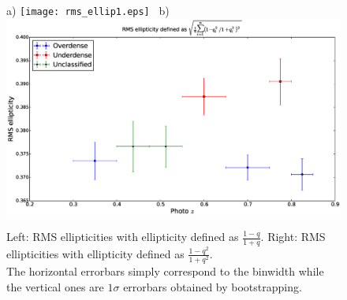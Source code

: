 \documentclass[twocolumn,useAMS,usenatbib]{mn2e}
\begin{document}
\begin{figure}
 \centering
 a) \texttt{[image: rms\_ellip1.eps]} \
 b) \includegraphics[width=0.9\columnwidth]{rms_ellip2_noevolution.eps} \\
 \caption{Left: RMS ellipticities with ellipticity defined as $\frac{1-q}{1+q}$. \; 
          Right: RMS ellipticities with ellipticity defined as $\frac{1-q^2}{1+q^2}$.\\ The horizontal errorbars simply correspond to the binwidth while the vertical ones
          are $1\sigma$ errorbars obtained by bootstrapping.}
 \label{fig:rms_ellip}
\end{figure}
\end{document}
